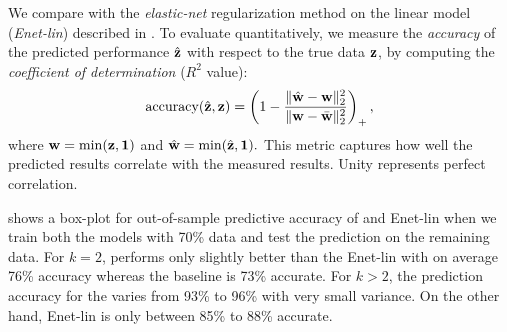 We compare \SYSTEM{} with the \textit{elastic-net} regularization
method on the linear model (\textit{Enet-lin}) described in
.   To evaluate
quantitatively, we measure the \emph{accuracy} of the predicted
performance $\hat{\mathbf{z}}$ with respect to the true data $\mathbf{z}$, by
computing the \emph{coefficient of determination} ($R^2$ value):
\begin{equation}
\label{eq:accuracy}
\text{accuracy}(\hat{\mathbf{z}},\mathbf{z}) = \left(1 - \frac{\| \hat{\mathbf{w}}-\mathbf{w} \|^2_2}{\| \mathbf{w} - \bar{\mathbf{w}}\|^2_2}\right)_{+},
\end{equation}
where $\mathbf{w} = \min(\mathbf{z},\boldsymbol{1})$ and $\hat{\mathbf{w}} =
\min(\hat{\mathbf{z}},\boldsymbol{1}).$ This metric captures how well the
predicted results correlate with the measured results. Unity
represents perfect correlation.



 shows a box-plot for out-of-sample
predictive accuracy of \SYSTEM{} and Enet-lin when we train both the
models with 70\% data and test the prediction on the remaining data.
For $k=2$, \SYSTEM{} performs only slightly better than the Enet-lin
with on average 76\% accuracy whereas the baseline is 73\% accurate.
For $k>2$, the prediction accuracy for the \SYSTEM{} varies from 93\%
to 96\% with very small variance. On the other hand, Enet-lin is only
between 85\% to 88\% accurate.

